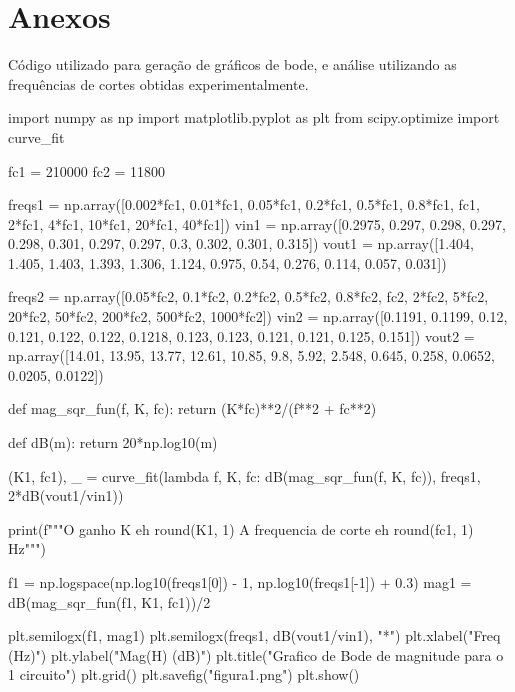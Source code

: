 \section{Anexos}

Código utilizado para geração de gráficos de bode, e análise utilizando as frequências de cortes obtidas experimentalmente.

\begin{python}
    import numpy as np
    import matplotlib.pyplot as plt
    from scipy.optimize import curve_fit



    fc1 = 210000
    fc2 = 11800


    freqs1 = np.array([0.002*fc1, 0.01*fc1, 0.05*fc1, 0.2*fc1, 0.5*fc1,
            0.8*fc1, fc1, 2*fc1, 4*fc1, 10*fc1, 20*fc1, 40*fc1])
    vin1 = np.array([0.2975, 0.297, 0.298, 0.297, 0.298,
            0.301, 0.297, 0.297, 0.3, 0.302, 0.301, 0.315])
    vout1 = np.array([1.404, 1.405, 1.403, 1.393, 1.306, 1.124,
            0.975, 0.54, 0.276, 0.114, 0.057, 0.031])


    freqs2 = np.array([0.05*fc2, 0.1*fc2, 0.2*fc2, 0.5*fc2, 0.8*fc2, fc2,
            2*fc2, 5*fc2, 20*fc2, 50*fc2, 200*fc2, 500*fc2, 1000*fc2])
    vin2 = np.array([0.1191, 0.1199, 0.12, 0.121, 0.122, 0.122,
            0.1218, 0.123, 0.123, 0.121, 0.121, 0.125, 0.151])
    vout2 = np.array([14.01, 13.95, 13.77, 12.61, 10.85, 9.8, 5.92,
            2.548, 0.645, 0.258, 0.0652, 0.0205, 0.0122])




    def mag_sqr_fun(f, K, fc):
    return (K*fc)**2/(f**2 + fc**2)


    def dB(m):
    return 20*np.log10(m)




    (K1, fc1), _ = curve_fit(lambda f, K, fc: dB(mag_sqr_fun(f, K, fc)),
    freqs1, 2*dB(vout1/vin1))


    print(f"""O ganho K eh {round(K1, 1)}
    A frequencia de corte eh {round(fc1, 1)} Hz""")

    f1 = np.logspace(np.log10(freqs1[0]) - 1, np.log10(freqs1[-1]) + 0.3)
    mag1 = dB(mag_sqr_fun(f1, K1, fc1))/2

    plt.semilogx(f1, mag1)
    plt.semilogx(freqs1, dB(vout1/vin1), "*")
    plt.xlabel("Freq (Hz)")
    plt.ylabel("Mag(H) (dB)")
    plt.title("Grafico de Bode de magnitude para o 1 circuito")
    plt.grid()
    plt.savefig("figura1.png")
    plt.show()




\end{python}
